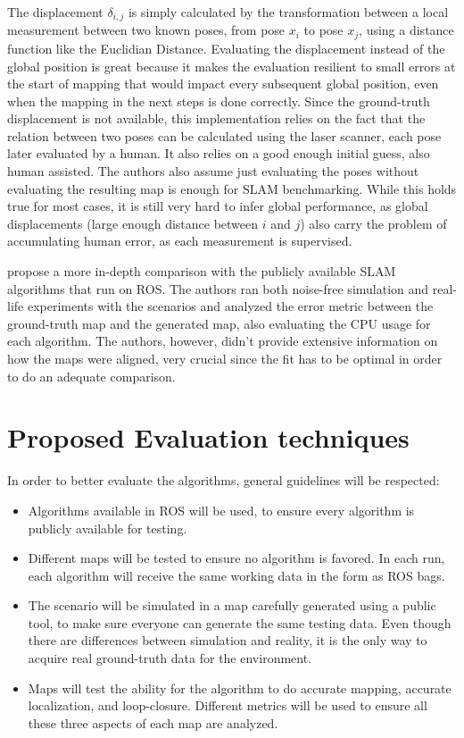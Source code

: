  The displacement $\delta_{i, j}$ is simply calculated by the transformation between a local measurement between two known poses, from pose $x_i$ to pose $x_j$, using a distance function like the Euclidian Distance. Evaluating the displacement instead of the global position is great because it makes the evaluation resilient to small errors at the start of mapping that would impact every subsequent global position, even when the mapping in the next steps is done correctly. Since the ground-truth displacement is not available, this implementation relies on the fact that the relation between two poses can be calculated using the laser scanner, each pose later evaluated by a human. It also relies on a good enough initial guess, also human assisted. The authors also assume just evaluating the poses without evaluating the resulting map is enough for SLAM benchmarking. While this holds true for most cases, it is still very hard to infer global performance, as global displacements (large enough distance between $i$ and $j$) also carry the problem of accumulating human error, as each measurement is supervised.
 
 \citeauthor{santos2013evaluation} propose a more in-depth comparison with the publicly available SLAM algorithms that run on ROS. The authors ran both noise-free simulation and real-life experiments with the scenarios and analyzed the error metric between the ground-truth map and the generated map, also evaluating the CPU usage for each algorithm. The authors, however, didn't provide extensive information on how the maps were aligned, very crucial since the fit has to be optimal in order to do an adequate comparison.
 
 \section{Proposed Evaluation techniques}
 
 In order to better evaluate the algorithms, general guidelines will be respected:
 
 \begin{itemize}
     \item Algorithms available in ROS will be used, to ensure every algorithm is publicly available for testing.
     \item Different maps will be tested to ensure no algorithm is favored. In each run, each algorithm will receive the same working data in the form as ROS bags.
     \item The scenario will be simulated in a map carefully generated using a public tool, to make sure everyone can generate the same testing data. Even though there are differences between simulation and reality, it is the only way to acquire real ground-truth data for the environment.
     \item Maps will test the ability for the algorithm to do accurate mapping, accurate localization, and loop-closure. Different metrics will be used to ensure all these three aspects of each map are analyzed.
 \end{itemize}
 
